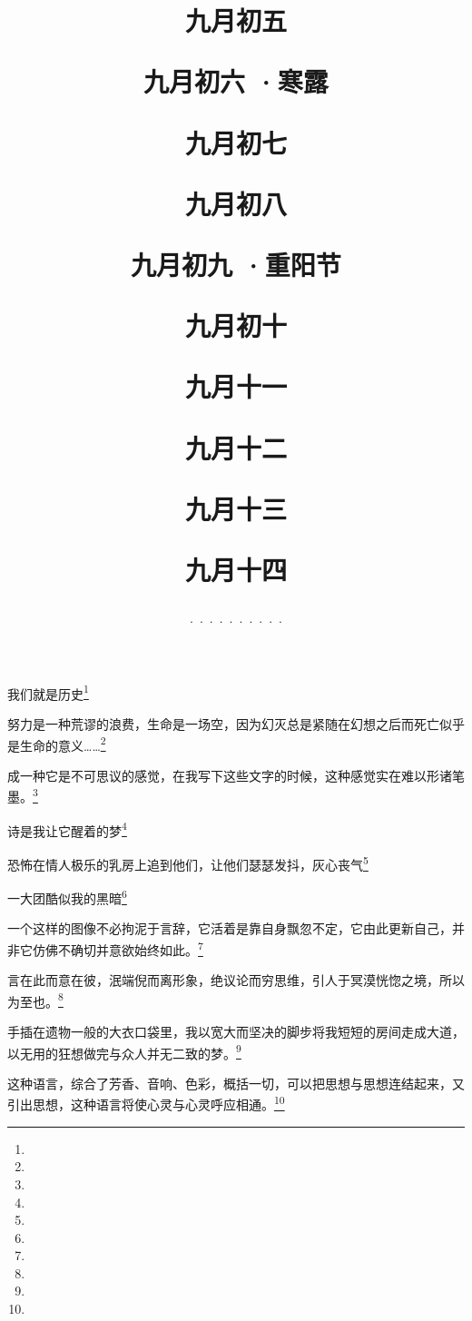 \title{\date[d=7,m=10,y=2024][year:cn-y,年,month:cn,day:cn,日,·,weekday]·九月初五 }
我们就是历史\footnote{ }

\title{\date[d=8,m=10,y=2024][year:cn-y,年,month:cn,day:cn,日,·,weekday]·九月初六 ·寒露}
努力是一种荒谬的浪费，生命是一场空，因为幻灭总是紧随在幻想之后而死亡似乎是生命的意义……\footnote{ }

\title{\date[d=9,m=10,y=2024][year:cn-y,年,month:cn,day:cn,日,·,weekday]·九月初七 }
成一种它是不可思议的感觉，在我写下这些文字的时候，这种感觉实在难以形诸笔墨。\footnote{ }

\title{\date[d=10,m=10,y=2024][year:cn-y,年,month:cn,day:cn,日,·,weekday]·九月初八 }
诗是我让它醒着的梦\footnote{ }

\title{\date[d=11,m=10,y=2024][year:cn-y,年,month:cn,day:cn,日,·,weekday]·九月初九 ·重阳节}
恐怖在情人极乐的乳房上追到他们，让他们瑟瑟发抖，灰心丧气\footnote{ }

\title{\date[d=12,m=10,y=2024][year:cn-y,年,month:cn,day:cn,日,·,weekday]·九月初十 }
一大团酷似我的黑暗\footnote{ }

\title{\date[d=13,m=10,y=2024][year:cn-y,年,month:cn,day:cn,日,·,weekday]·九月十一 }
一个这样的图像不必拘泥于言辞，它活着是靠自身飘忽不定，它由此更新自己，并非它仿佛不确切并意欲始终如此。\footnote{ }

\title{\date[d=14,m=10,y=2024][year:cn-y,年,month:cn,day:cn,日,·,weekday]·九月十二 }
言在此而意在彼，泯端倪而离形象，绝议论而穷思维，引人于冥漠恍惚之境，所以为至也。\footnote{ }

\title{\date[d=15,m=10,y=2024][year:cn-y,年,month:cn,day:cn,日,·,weekday]·九月十三 }
手插在遗物一般的大衣口袋里，我以宽大而坚决的脚步将我短短的房间走成大道，以无用的狂想做完与众人并无二致的梦。\footnote{ }

\title{\date[d=16,m=10,y=2024][year:cn-y,年,month:cn,day:cn,日,·,weekday]·九月十四 }
这种语言，综合了芳香、音响、色彩，概括一切，可以把思想与思想连结起来，又引出思想，这种语言将使心灵与心灵呼应相通。\footnote{ }


